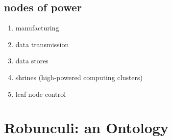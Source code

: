 \subsection{nodes of power}
        \begin{enumerate}
            \item manufacturing
            \item data transmission
            \item data stores
            \item shrines (high-powered computing clusters)
            \item leaf node control
        \end{enumerate}        


\section{Robunculi: an Ontology}
\label{sec:robunculi_ontology}
